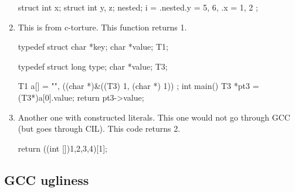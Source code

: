 \documentclass{article}
\begin{document}
\begin{enumerate}
\begin{cilcode}[global]
struct { 
   int x; 
   struct { 
       int y, z; 
   } nested;
} i = { .nested.y = 5, 6, .x = 1, 2 };               
\end{cilcode}

\item This is from c-torture. This function returns 1.

\begin{cilcode}[global]
typedef struct
{
  char *key;
  char *value;
} T1;

typedef struct
{
  long type;
  char *value;
} T3;

T1 a[] =
{
  {
    "",
    ((char *)&((T3) {1, (char *) 1}))
  }
};
int main() {
   T3 *pt3 = (T3*)a[0].value;
   return pt3->value;
}
\end{cilcode}

\item Another one with constructed literals. This one would not go through GCC
(but goes through CIL). This code returns 2.

\begin{cilcode}[local]
 return ((int []){1,2,3,4})[1];
\end{cilcode}

\end{enumerate}

 \subsection{GCC ugliness}\label{ugly-gcc}
\end{document}
